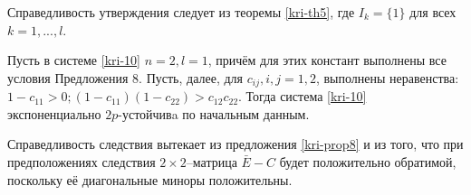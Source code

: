 Справедливость утверждения следует из теоремы \ref{kri-th5}, где $I_k = \{1\}$
для всех $k = 1, ..., l$.

\begin{corollary}\label{kri-cor2}
 Пусть в системе \eqref{kri-10} $n = 2, l =1$, причём для этих констант выполнены все условия Предложения 8. Пусть, далее, для $c_{ij}, i,j = 1, 2$, выполнены неравенства: $ 1 - c_{11} > 0; (1 - c_{11})(1 - c_{22}) > c_{12}c_{22}$. Тогда система \eqref{kri-10}
экспоненциально $2p$-устойчивa по начальным данным.
\end{corollary}

Справедливость следствия вытекает из предложения \ref{kri-prop8} и из того, что при
предположениях следствия $2\times 2$--матрица $\bar E - C$ будет
положительно обратимой, поскольку её диагональные миноры
положительны.






%
